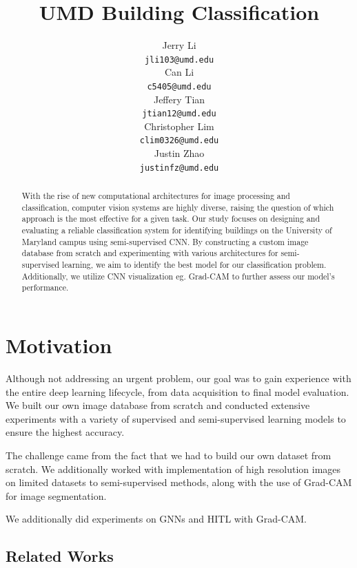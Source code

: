 \documentclass{article}
\title{ UMD Building Classification }
\author{%
  Jerry Li\\
  \texttt{jli103@umd.edu} \\
  \And 
  Can Li \\
  \texttt{c5405@umd.edu} \\
  \And 
  Jeffery Tian \\
  \texttt{jtian12@umd.edu} \\
  \And 
  Christopher Lim \\
  \texttt{clim0326@umd.edu} \\
  \And 
  Justin Zhao \\
  \texttt{justinfz@umd.edu} \\
}
\begin{document}
\maketitle



\begin{abstract}
    With the rise of new computational architectures for image processing and classification, computer vision systems are highly diverse, raising the question of which approach is the most effective for a given task. Our study focuses on designing and evaluating a reliable classification system for identifying buildings on the University of Maryland campus using semi-supervised CNN. By constructing a custom image database from scratch and experimenting with various architectures for semi-supervised learning, we aim to identify the best model for our classification problem. Additionally, we utilize CNN visualization eg. Grad-CAM to further assess our model’s performance.
\end{abstract}


\section{Motivation}
\label{motivation}

Although not addressing an urgent problem, our goal was to gain experience with the entire deep learning lifecycle, from data acquisition to final model evaluation. We built our own image database from scratch and conducted extensive experiments with a variety of supervised and semi-supervised learning models to ensure the highest accuracy.

The challenge came from the fact that we had to build our own dataset from scratch. We additionally worked with implementation of high resolution images on limited datasets to semi-supervised methods, along with the use of Grad-CAM for image segmentation.

We additionally did experiments on GNNs and HITL with Grad-CAM.

\subsection{Related Works}
\end{document}
